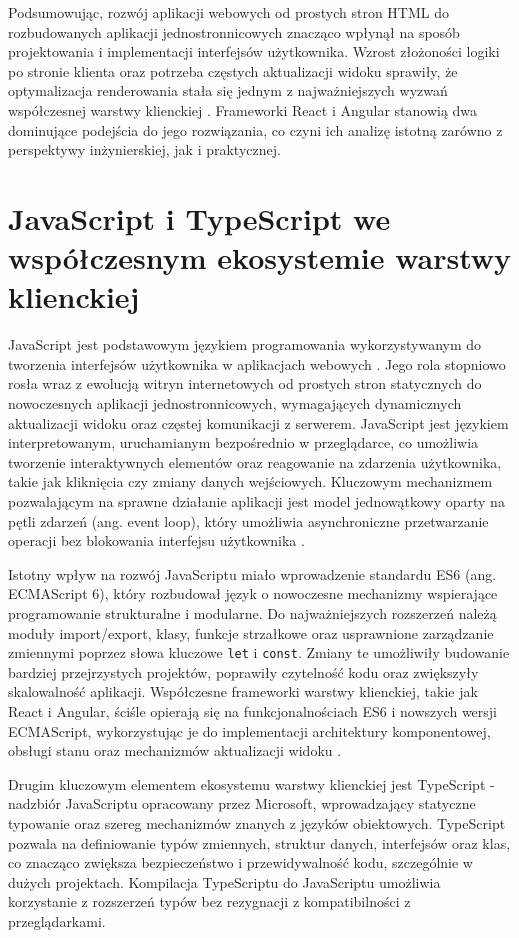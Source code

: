 \documentclass[12pt,openright,twoside]{report}
\begin{document}
Podsumowując, rozwój aplikacji webowych od prostych stron HTML do rozbudowanych aplikacji jednostronnicowych znacząco wpłynął na sposób projektowania i implementacji interfejsów użytkownika. Wzrost złożoności logiki po stronie klienta oraz potrzeba częstych aktualizacji widoku sprawiły, że optymalizacja renderowania stała się jednym z najważniejszych wyzwań współczesnej warstwy klienckiej \cite{High_Perf_JS}. Frameworki React i Angular stanowią dwa dominujące podejścia do jego rozwiązania, co czyni ich analizę istotną zarówno z perspektywy inżynierskiej, jak i praktycznej.

\section{JavaScript i TypeScript we współczesnym ekosystemie warstwy klienckiej}
JavaScript jest podstawowym językiem programowania wykorzystywanym do tworzenia interfejsów użytkownika w aplikacjach webowych \cite{Eloquent_JS}. Jego rola stopniowo rosła wraz z ewolucją witryn internetowych od prostych stron statycznych do nowoczesnych aplikacji jednostronnicowych, wymagających dynamicznych aktualizacji widoku oraz częstej komunikacji z serwerem. JavaScript jest językiem interpretowanym, uruchamianym bezpośrednio w przeglądarce, co umożliwia tworzenie interaktywnych elementów oraz reagowanie na zdarzenia użytkownika, takie jak kliknięcia czy zmiany danych wejściowych. Kluczowym mechanizmem pozwalającym na sprawne działanie aplikacji jest model jednowątkowy oparty na pętli zdarzeń (ang. event loop), który umożliwia asynchroniczne przetwarzanie operacji bez blokowania interfejsu użytkownika \cite{MDN_Event_Loop}.

Istotny wpływ na rozwój JavaScriptu miało wprowadzenie standardu ES6 (ang. ECMAScript 6), który rozbudował język o nowoczesne mechanizmy wspierające programowanie strukturalne i modularne. Do najważniejszych rozszerzeń należą moduły import/export, klasy, funkcje strzałkowe oraz usprawnione zarządzanie zmiennymi poprzez słowa kluczowe \texttt{let} i \texttt{const}. Zmiany te umożliwiły budowanie bardziej przejrzystych projektów, poprawiły czytelność kodu oraz zwiększyły skalowalność aplikacji. Współczesne frameworki warstwy klienckiej, takie jak React i Angular, ściśle opierają się na funkcjonalnościach ES6 i nowszych wersji ECMAScript, wykorzystując je do implementacji architektury komponentowej, obsługi stanu oraz mechanizmów aktualizacji widoku \cite{High_Perf_JS}.

Drugim kluczowym elementem ekosystemu warstwy klienckiej jest TypeScript - nadzbiór JavaScriptu opracowany przez Microsoft, wprowadzający statyczne typowanie oraz szereg mechanizmów znanych z języków obiektowych. TypeScript pozwala na definiowanie typów zmiennych, struktur danych, interfejsów oraz klas, co znacząco zwiększa bezpieczeństwo i przewidywalność kodu, szczególnie w dużych projektach. Kompilacja TypeScriptu do JavaScriptu umożliwia korzystanie z rozszerzeń typów bez rezygnacji z kompatibilności z przeglądarkami.
\end{document}
